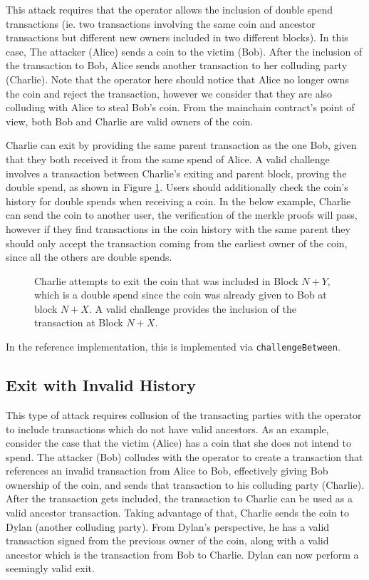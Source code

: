 This attack requires that the operator allows the inclusion of double spend
transactions (ie. two transactions involving the same coin and ancestor
transactions but different new owners included in two different blocks). 
In this case, The attacker (Alice) sends a coin to the victim (Bob). 
After the inclusion of the transaction to Bob, Alice sends another transaction to her colluding party (Charlie). Note that the operator here should notice that Alice no longer owns the coin and reject the transaction, however we consider that they are also colluding with Alice to steal Bob's coin. From the mainchain contract's point of view, both Bob and Charlie are valid owners of the coin. 

Charlie can exit by providing the same parent transaction as the one Bob, given that they both received it from the same spend of Alice. A valid challenge involves a transaction between Charlie's exiting and parent block, proving the double spend, as shown in Figure \ref{fig:challenge_between}. Users should additionally check the coin's history for double spends when receiving a coin. In the below example, Charlie can send the coin to another user, the verification of the merkle proofs will pass, however if they find transactions in the coin history with the same parent they should only accept the transaction coming from the earliest owner of the coin, since all the others are double spends.

\begin{figure}[H]
	\caption{
        Charlie attempts to exit the coin that was included in Block $N+Y$,
        which is a double spend since the coin was already given to Bob at
        block $N+X$. A valid challenge provides the inclusion of the
        transaction at Block $N+X$. 
    }
    \label{fig:challenge_between}
\end{figure}

In the reference implementation, this is implemented via \texttt{challengeBetween}.

\subsection{Exit with Invalid History} \label{exit_with_invalid_history}

This type of attack requires collusion of the transacting parties with the operator to
include transactions which do not have valid ancestors. As an example, consider
the case that the victim (Alice) has a coin that she does not intend to spend. The attacker (Bob) colludes with the operator to create a transaction that
references an invalid transaction from Alice to Bob, effectively giving Bob
ownership of the coin, and sends that transaction to his colluding party (Charlie). After the transaction gets included, the transaction to Charlie can be used 
as a valid ancestor transaction. Taking advantage of that, Charlie sends the coin to
Dylan (another colluding party). From Dylan's perspective, he has a valid transaction signed from the
previous owner of the coin, along with a valid ancestor which is the
transaction from Bob to Charlie. Dylan can now perform a seemingly valid exit.

